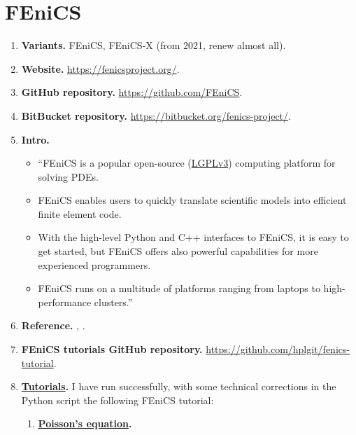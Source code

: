 \documentclass[onsided]{book}
\numberwithin{equation}{section}
\begin{document}
\section{FEniCS}
\begin{enumerate}
    \item \textbf{Variants.} FEniCS, FEniCS-X (from 2021, renew almost all).
    \item \textbf{Website.} \url{https://fenicsproject.org/}.
    \item \textbf{GitHub repository.} \url{https://github.com/FEniCS}.
    \item \textbf{BitBucket repository.} \url{https://bitbucket.org/fenics-project/}.
    \item \textbf{Intro.}
    \begin{itemize}
        \item ``FEniCS is a popular open-source (\href{https://www.gnu.org/licenses/lgpl-3.0.en.html}{LGPLv3}) computing platform for solving PDEs.
        \item FEniCS enables users to quickly translate scientific models into efficient finite element code.
        \item With the high-level Python and C++ interfaces to FEniCS, it is easy to get started, but FEniCS offers also powerful capabilities for more experienced programmers.
        \item FEniCS runs on a multitude of platforms ranging from laptops to high-performance clusters.''
    \end{itemize}
    \item \textbf{Reference.} \cite{Dokken_Mitusch_Funke2020}, \cite{Langtangen_Logg2016}.
    \item \textbf{FEniCS tutorials GitHub repository.} \url{https://github.com/hplgit/fenics-tutorial}.
    \item \textbf{\href{https://fenicsproject.org/tutorial/}{Tutorials}.} I have run successfully, with some technical corrections in the Python script the following FEniCS tutorial:
    \begin{enumerate}
        \item \textbf{\href{https://github.com/hplgit/fenics-tutorial/blob/master/pub/python/vol1/ft01\_poisson.py}{Poisson's equation}.}
        

\end{enumerate}
\end{enumerate}
\end{document}
